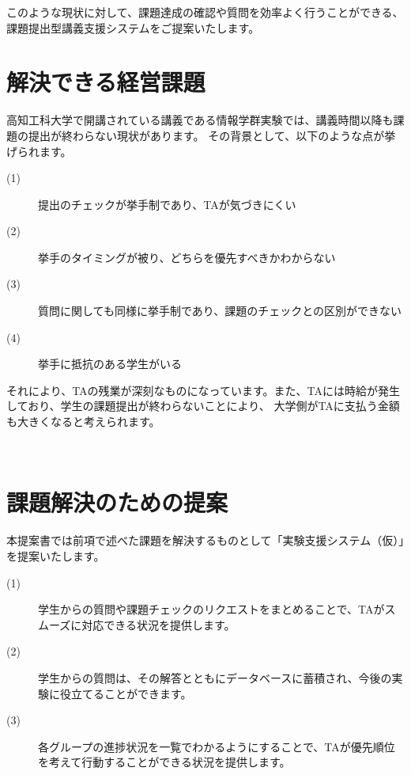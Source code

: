 \documentclass[a4j,titlepage]{ujarticle}
\begin{document}
このような現状に対して、課題達成の確認や質問を効率よく行うことができる、課題提出型講義支援システムをご提案いたします。

\section{解決できる経営課題}
高知工科大学で開講されている講義である情報学群実験では、講義時間以降も課題の提出が終わらない現状があります。 %
その背景として、以下のような点が挙げられます。
\begin{description}
\item[(1)]提出のチェックが挙手制であり、TAが気づきにくい %
\item[(2)]挙手のタイミングが被り、どちらを優先すべきかわからない
\item[(3)]質問に関しても同様に挙手制であり、課題のチェックとの区別ができない
\item[(4)]挙手に抵抗のある学生がいる
\end{description}
それにより、TAの残業が深刻なものになっています。また、TAには時給が発生しており、学生の課題提出が終わらないことにより、
大学側がTAに支払う金額も大きくなると考えられます。






\section{課題解決のための提案}
本提案書では前項で述べた課題を解決するものとして「実験支援システム（仮）」を提案いたします。

\begin{description}
\item[(1)]学生からの質問や課題チェックのリクエストをまとめることで、TAがスムーズに対応できる状況を提供します。
\item[(2)]学生からの質問は、その解答とともにデータベースに蓄積され、今後の実験に役立てることができます。
\item[(3)]各グループの進捗状況を一覧でわかるようにすることで、TAが優先順位を考えて行動することができる状況を提供します。
\end{description}
\end{document}
